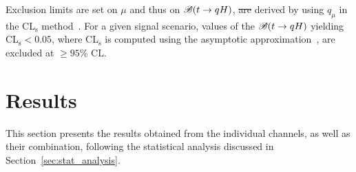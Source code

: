 \documentclass[PAPER, coverpage, atlasdraft=true, texlive=2016, UKenglish]{\ATLASLATEXPATH atlasdoc}
\providecommand{\DIFadd}[1]{{\protect\color{blue}\uwave{#1}}} %
\providecommand{\DIFdel}[1]{{\protect\color{red}\sout{#1}}}                      %
\providecommand{\DIFaddbegin}{} %
\providecommand{\DIFaddend}{} %
\providecommand{\DIFdelbegin}{} %
\providecommand{\DIFdelend}{} %
\begin{document}
Exclusion limits are set on $\mu$ and thus on
$\mathscr{B}(t\to qH)$, \DIFdelbegin \DIFdel{are }\DIFdelend derived by using $q_\mu$ in the CL$_{\textrm{s}}$ method~\cite{Junk:1999kv,Read:2002hq}.
For a given signal scenario, values of the $\mathscr{B}(t\to qH)$ yielding CL$_{\textrm{s}} < 0.05$,
where CL$_{\textrm{s}}$ is computed using the asymptotic approximation~\cite{Cowan:2010js}, are excluded at $\geq 95\%$ CL.


\section{Results}
\label{sec:result}

This section presents the results obtained from the individual channels, as well as their combination,
\DIFaddbegin \DIFadd{by }\DIFaddend following the statistical analysis discussed in Section~\ref{sec:stat_analysis}.
\end{document}

